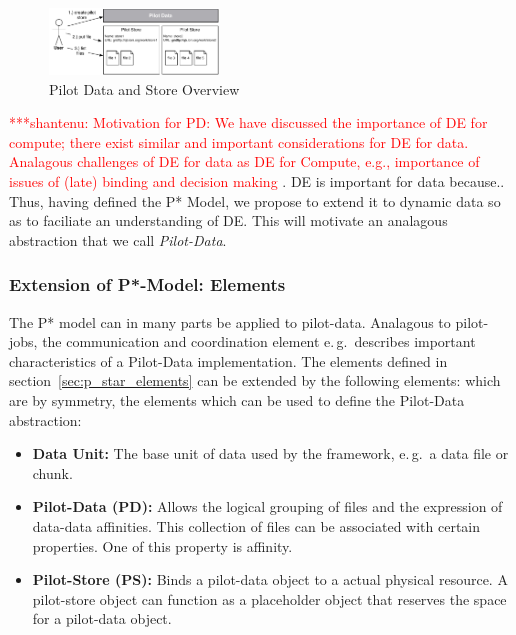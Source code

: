 \documentclass[conference,final]{IEEEtran}
\newcommand{\jhanote}[1]{ {\textcolor{red} { ***shantenu: #1 }}}
\newcommand{\jhanote}[1]{}
\begin{document}

\begin{figure}[t]
    \centering
        \includegraphics[width=0.4\textwidth]{figures/pilotstore.pdf}
    \caption{Pilot Data and Store Overview}
    \label{fig:figures_pilotstore}
\end{figure}

\jhanote{Motivation for PD: We have discussed the importance of DE for
  compute; there exist similar and important considerations for DE for
  data. Analagous challenges of DE for data as DE for Compute, e.g.,
  importance of issues of (late) binding and decision making}.  DE is
important for data because.. Thus, having defined the P* Model, we
propose to extend it to dynamic data so as to faciliate an
understanding of DE.  This will motivate an analagous abstraction that
we call \emph{Pilot-Data}.

\subsubsection*{Extension of P*-Model: Elements}

The P* model can in many parts be applied to pilot-data. Analagous to
pilot-jobs, the communication and coordination element e.\,g.\
describes important characteristics of a Pilot-Data implementation.
The elements defined in section~\ref{sec:p_star_elements} can be
extended by the following elements: which are by symmetry, the
elements which can be used to define the Pilot-Data abstraction:

\begin{itemize}
\item \textbf{Data Unit:} The base unit of data used by the framework,
  e.\,g.\ a data file or chunk.
\item \textbf{Pilot-Data (PD):} Allows the logical grouping of files
  and the expression of data-data affinities. This collection of files
  can be associated with certain properties. One of this property is
  affinity.
\item \textbf{Pilot-Store (PS):} Binds a pilot-data object to a actual
  physical resource. A pilot-store object can function as a
  placeholder object that reserves the space for a pilot-data object.
\end{itemize}
\end{document}
